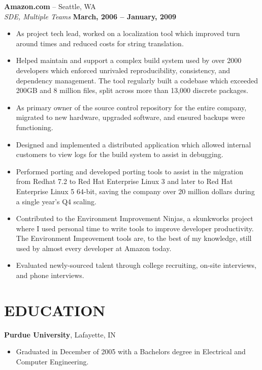 \documentclass[line, margin]{res}
\begin{document}
\begin{resume}
{\bf Amazon.com} -- Seattle, WA
\\
\textit{SDE, Multiple Teams} \hfill {\bf March, 2006 -- January, 2009}
\\
\begin{itemize}
\item
As project tech lead, worked on a localization tool which improved turn around times and reduced
costs for string translation.
\item
Helped maintain and support a complex build system used by over 2000 developers
which enforced unrivaled reproducibility, consistency, and dependency
management.  The tool regularly built a codebase which exceeded 200GB and 8
million files, split across more than 13,000 discrete packages.
\item
As primary owner of the source control repository for the entire company,
migrated to new hardware, upgraded software, and ensured backups were
functioning.
\item
Designed and implemented a distributed application which allowed internal
customers to view logs for the build system to assist in debugging.
\item
Performed porting and developed porting tools to assist in the migration from
Redhat 7.2 to Red Hat Enterprise Linux 3 and later to Red Hat Enterprise Linux
5 64-bit, saving the company over 20 million dollars during a single year's Q4
scaling.
\item
Contributed to the Environment Improvement Ninjas, a skunkworks project where I
used personal time to write tools to improve developer productivity.  The
Environment Improvement tools are, to the best of my knowledge, still used by
almost every developer at Amazon today.
\item
Evaluated newly-sourced talent through college recruiting, on-site interviews,
and phone interviews.
\end{itemize}

\section{EDUCATION}

{\bf Purdue University}, Lafayette, IN
\begin{itemize}
\item
Graduated in December of 2005 with a Bachelors degree in Electrical and
Computer Engineering.
\end{itemize}


\end{resume}
\end{document}
